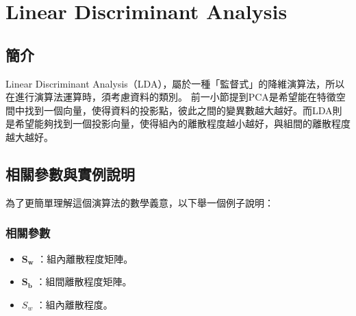 \chapter{Linear Discriminant Analysis}
\label{chapter:pca}
\section{簡介}
\label{sec:background}




Linear Discriminant Analysis（LDA），屬於一種「監督式」的降維演算法，所以在進行演算法運算時，須考慮資料的類別。
前一小節提到PCA是希望能在特徵空間中找到一個向量，使得資料的投影點，彼此之間的變異數越大越好。而LDA則是希望能夠找到一個投影向量，使得組內的離散程度越小越好，與組間的離散程度越大越好。




\section{相關參數與實例說明}
為了更簡單理解這個演算法的數學義意，以下舉一個例子說明：


\subsection{相關參數}

\begin{itemize}
	\item 
		\(\mathbf{S_w}\) ：組內離散程度矩陣。
	\item 
		\(\mathbf{S_b}\) ：組間離散程度矩陣。
	\item 
		\(S_w\) ：組內離散程度。
\end{itemize}

